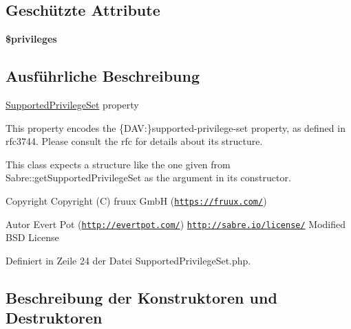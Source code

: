 \subsection*{Geschützte Attribute}
\begin{DoxyCompactItemize}
\item 
\mbox{\label{class_sabre_1_1_d_a_v_a_c_l_1_1_xml_1_1_property_1_1_supported_privilege_set_a8dc2bdf07a8f1fbcf98785777fad6fa6}} 
{\bfseries \$privileges}
\end{DoxyCompactItemize}


\subsection{Ausführliche Beschreibung}
\mbox{\hyperlink{class_sabre_1_1_d_a_v_a_c_l_1_1_xml_1_1_property_1_1_supported_privilege_set}{Supported\+Privilege\+Set}} property

This property encodes the \{D\+AV\+:\}supported-\/privilege-\/set property, as defined in rfc3744. Please consult the rfc for details about it\textquotesingle{}s structure.

This class expects a structure like the one given from Sabre\+::get\+Supported\+Privilege\+Set as the argument in its constructor.

\begin{DoxyCopyright}{Copyright}
Copyright (C) fruux GmbH (\href{https://fruux.com/}{\tt https\+://fruux.\+com/}) 
\end{DoxyCopyright}
\begin{DoxyAuthor}{Autor}
Evert Pot (\href{http://evertpot.com/}{\tt http\+://evertpot.\+com/})  \href{http://sabre.io/license/}{\tt http\+://sabre.\+io/license/} Modified B\+SD License 
\end{DoxyAuthor}


Definiert in Zeile 24 der Datei Supported\+Privilege\+Set.\+php.



\subsection{Beschreibung der Konstruktoren und Destruktoren}
\mbox{\label{class_sabre_1_1_d_a_v_a_c_l_1_1_xml_1_1_property_1_1_supported_privilege_set_ad013301ba8a64b204bf81bf36d50cd25}} 
